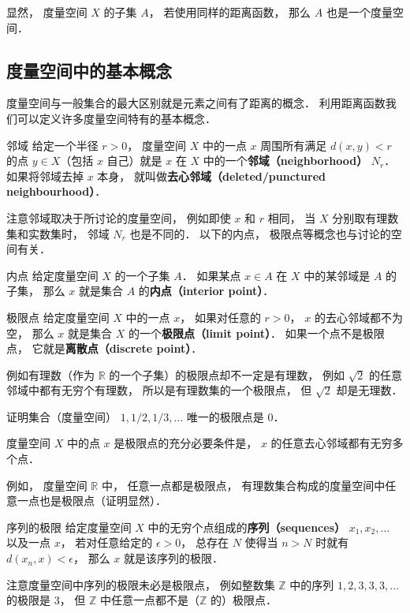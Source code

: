 显然， 度量空间 $X$ 的子集 $A$， 若使用同样的距离函数， 那么 $A$ 也是一个度量空间．

\subsection{度量空间中的基本概念}
度量空间与一般集合的最大区别就是元素之间有了距离的概念． 利用距离函数我们可以定义许多度量空间特有的基本概念．

\begin{definition}{邻域}
给定一个半径 $r > 0$， 度量空间 $X$ 中的一点 $x$ 周围所有满足 $d(x, y) < r$ 的点 $y \in X$（包括 $x$ 自己）就是 $x$ 在 $X$ 中的一个\textbf{邻域（neighborhood）} $N_r$． 如果将邻域去掉 $x$ 本身， 就叫做\textbf{去心邻域（deleted/punctured neighbourhood）}．
\end{definition}
注意邻域取决于所讨论的度量空间， 例如即使 $x$ 和 $r$ 相同， 当 $X$ 分别取有理数集和实数集时， 邻域 $N_r$ 也是不同的． 以下的内点， 极限点等概念也与讨论的空间有关．

\begin{definition}{内点}
给定度量空间 $X$ 的一个子集 $A$． 如果某点 $x\in A$ 在 $X$ 中的某邻域是 $A$ 的子集， 那么 $x$ 就是集合 $A$ 的\textbf{内点（interior point）}．
\end{definition}

\begin{definition}{极限点}
给定度量空间 $X$ 中的一点 $x$， 如果对任意的 $r > 0$， $x$ 的去心邻域都不为空， 那么 $x$ 就是集合 $X$ 的一个\textbf{极限点（limit point）}． 如果一个点不是极限点， 它就是\textbf{离散点（discrete point）}．
\end{definition}
例如有理数（作为 $\mathbb R$ 的一个子集）的极限点却不一定是有理数， 例如 $\sqrt{2}$ 的任意邻域中都有无穷个有理数， 所以是有理数集的一个极限点， 但 $\sqrt{2}$ 却是无理数．

\begin{exercise}{}
证明集合（度量空间） ${1, 1/2, 1/3, \dots}$ 唯一的极限点是 $0$．
\end{exercise}

\begin{corollary}{}
度量空间 $X$ 中的点 $x$ 是极限点的充分必要条件是， $x$ 的任意去心邻域都有无穷多个点．
\end{corollary}

例如， 度量空间 $\mathbb R$ 中， 任意一点都是极限点， 有理数集合构成的度量空间中任意一点也是极限点（证明显然）．

\begin{definition}{序列的极限}
给定度量空间 $X$ 中的无穷个点组成的\textbf{序列（sequences）} $x_1, x_2, \dots$ 以及一点 $x$， 若对任意给定的 $\epsilon > 0$， 总存在 $N$ 使得当 $n > N$ 时就有 $d(x_n, x) < \epsilon$， 那么 $x$ 就是该序列的极限．
\end{definition}
注意度量空间中序列的极限未必是极限点， 例如整数集 $\mathbb Z$ 中的序列 $1, 2, 3, 3, 3, \dots$ 的极限是 $3$， 但 $\mathbb Z$ 中任意一点都不是（$\mathbb Z$ 的）极限点．

